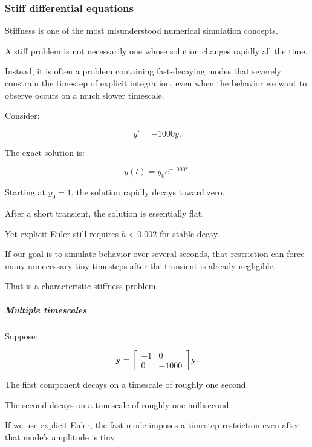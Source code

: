 \subsubsection{Stiff differential equations}\label{02-foundations-ii-ch025-stiff-differential-equations}

\hypertarget{02-foundations-ii-ch025-stiff-differential-equations}{}

Stiffness is one of the most misunderstood numerical simulation concepts.

A stiff problem is not necessarily one whose solution changes rapidly all the time.

Instead, it is often a problem containing fast-decaying modes that severely constrain the timestep of explicit integration, even when the behavior we want to observe occurs on a much slower timescale.

Consider:

\[
y'=-1000y.
\]

The exact solution is:

\[
y(t)=y_0e^{-1000t}.
\]

Starting at \(y_0=1\), the solution rapidly decays toward zero.

After a short transient, the solution is essentially flat.

Yet explicit Euler still requires \(h<0.002\) for stable decay.

If our goal is to simulate behavior over several seconds, that restriction can force many unnecessary tiny timesteps after the transient is already negligible.

That is a characteristic stiffness problem.

\subparagraph{Multiple timescales}\label{02-foundations-ii-ch025-multiple-timescales}

\hypertarget{02-foundations-ii-ch025-multiple-timescales}{}

Suppose:

\[
\dot{\mathbf y}= \begin{bmatrix} -1&0\\ 0&-1000 \end{bmatrix}\mathbf y.
\]

The first component decays on a timescale of roughly one second.

The second decays on a timescale of roughly one millisecond.

If we use explicit Euler, the fast mode imposes a timestep restriction even after that mode's amplitude is tiny.

